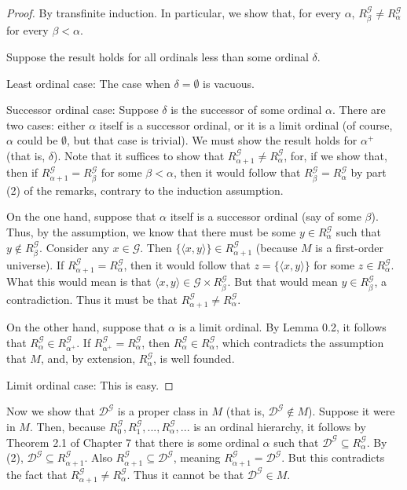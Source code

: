 \documentclass{article}
\theoremstyle{definition}
\begin{document}
\begin{proof}
By transfinite induction. In particular, we show that, for every $\alpha$, $R^\mathcal{G}_\beta\ne R^\mathcal{G}_\alpha$ for every 
$\beta<\alpha$.

Suppose the result holds for all ordinals less than some ordinal $\delta$.

Least ordinal case: The case when $\delta=\emptyset$ is vacuous.

Successor ordinal case: Suppose $\delta$ is the successor of some ordinal $\alpha$.
There are two cases: either $\alpha$ itself is a successor ordinal, 
or it is a limit ordinal (of course, $\alpha$ could be $\emptyset$, but that case is trivial). We must show the result holds for $\alpha^+$ 
(that is, $\delta$). 
Note that it suffices to show that $R^\mathcal{G}_{\alpha+1}\ne R^\mathcal{G}_\alpha$, for, if we show that, then if 
$R^\mathcal{G}_{\alpha+1}=R^\mathcal{G}_\beta$ for some $\beta<\alpha$, then it would follow that 
$R^\mathcal{G}_\beta=R^\mathcal{G}_\alpha$ by part (2) of the remarks, contrary to the induction assumption.

On the one hand, suppose that $\alpha$ itself is a successor ordinal (say of some $\beta$). Thus, by the assumption, we 
know that there must be some $y\in R^\mathcal{G}_\alpha$ such that $y\notin R^\mathcal{G}_\beta$. Consider any $x\in\mathcal{G}$. 
Then $\{\langle x,y\rangle\}\in R^\mathcal{G}_{\alpha+1}$ (because $M$ is a first-order universe). If 
$R^\mathcal{G}_{\alpha+1}=R^\mathcal{G}_\alpha$, then it would follow that $z=\{\langle x,y\rangle\}$ for some 
$z\in R^\mathcal{G}_\alpha$. What this would mean is that $\langle x,y\rangle\in\mathcal{G}\times R^\mathcal{G}_\beta$. 
But that would mean $y\in R^\mathcal{G}_\beta$, a contradiction. Thus it must be that $R^\mathcal{G}_{\alpha+1}\ne R^\mathcal{G}_\alpha$.

On the other hand, suppose that $\alpha$ is a limit ordinal. By Lemma 0.2, it follows that $R^\mathcal{G}_\alpha\in R^\mathcal{G}_{\alpha^+}$. 
If $R^\mathcal{G}_{\alpha^+}=R^\mathcal{G}_\alpha$, then $R^\mathcal{G}_\alpha\in R^\mathcal{G}_\alpha$, which contradicts the 
assumption that $M$, and, by extension, $R^\mathcal{G}_\alpha$, is well founded. 

Limit ordinal case: This is easy.
\end{proof}

Now we show that $\mathcal{D}^\mathcal{G}$ is a proper class in $M$ (that is, 
$\mathcal{D}^\mathcal{G}\notin M$). Suppose it were in $M$. Then, because 
$R^\mathcal{G}_0,R^\mathcal{G}_1,...,R^\mathcal{G}_\alpha,...$ is an ordinal hierarchy, it 
follows by Theorem 2.1 of Chapter 7 that there is some ordinal $\alpha$ such that 
$\mathcal{D}^\mathcal{G}\subseteq R^\mathcal{G}_\alpha$. By (2), 
$\mathcal{D}^\mathcal{G}\subseteq R^\mathcal{G}_{\alpha+1}$.
Also $R^\mathcal{G}_{\alpha+1}\subseteq\mathcal{D}^\mathcal{G}$, meaning 
$R^\mathcal{G}_{\alpha+1}=\mathcal{D}^\mathcal{G}$. But this contradicts the fact that
$R^\mathcal{G}_{\alpha+1}\ne R^\mathcal{G}_\alpha$. Thus it cannot be that 
$\mathcal{D}^\mathcal{G}\in M$.
\end{document}
